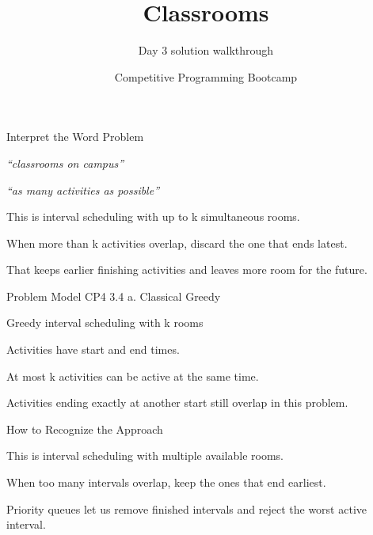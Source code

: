 \documentclass[aspectratio=169,11pt]{beamer}
\title[classrooms]{Classrooms}
\subtitle{Day 3 solution walkthrough}
\author[Solution Deck]{Competitive Programming Bootcamp}
\date{}
\begin{document}
\begin{frame}[plain]
  \titlepage
\end{frame}

\begin{frame}{Interpret the Word Problem}
\small
{}
\begin{tightitemize}
  \item \textit{``classrooms on campus''}
  \item \textit{``as many activities as possible''}
\end{tightitemize}

\vspace{0.18cm}
\begin{tightitemize}
  \item This is interval scheduling with up to k simultaneous rooms.
  \item When more than k activities overlap, discard the one that ends latest.
  \item That keeps earlier finishing activities and leaves more room for the future.
\end{tightitemize}
\end{frame}







\begin{frame}{Problem Model}
\small
{} CP4 3.4 a. Classical Greedy

\vspace{0.25cm}
 Greedy interval scheduling with k rooms

\vspace{0.25cm}
\begin{tightitemize}
  \item Activities have start and end times.
  \item At most k activities can be active at the same time.
  \item Activities ending exactly at another start still overlap in this problem.
\end{tightitemize}
\end{frame}

\begin{frame}{How to Recognize the Approach}
\begin{tightitemize}
  \item This is interval scheduling with multiple available rooms.
  \item When too many intervals overlap, keep the ones that end earliest.
  \item Priority queues let us remove finished intervals and reject the worst active interval.
\end{tightitemize}
\end{frame}
\end{document}
